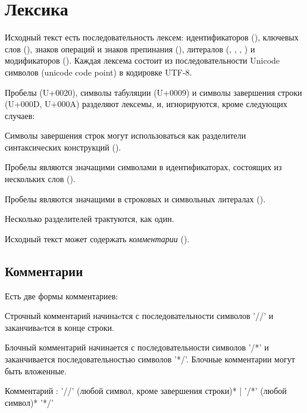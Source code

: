 \hypertarget{lexica}{%
\section{Лексика}\label{lex:chapter}}

Исходный текст есть последовательность лексем: идентификаторов (), ключевых слов (), 
знаков операций и знаков препинания (), литералов (, , , ) и модификаторов (). 
Каждая лексема состоит из последовательности Unicode символов (unicode code point) в кодировке UTF-8.

Пробелы (U+0020), символы табуляции (U+0009) и символы завершения строки (U+000D, U+000A) разделяют лексемы, и, игнорируются, кроме следующих случаев:
\begin{d_itemize}
\item
Символы завершения строк могут использоваться как разделители синтаксических конструкций ().
\item
  Пробелы являются значащими символами в идентификаторах, состоящих из нескольких слов (). 
\item
  Пробелы являются значащими в строковых и символьных литералах (). 
\end{d_itemize}

Несколько разделителей трактуются, как один.

\bigskip
Исходный текст может содержать \emph{комментарии} ().

\hypertarget{comments}{%
\subsection{Комментарии}\label{lex:comments}}

Есть две формы комментариев:
\begin{d_itemize}
\item
Строчный комментарий начинаeтся с последовательности символов '//' и заканчиваeтся в конце строки.
\item
Блочный комментарий начинается с последовательности символов '/*' и заканчивается последовательностью символов '*/'. 
Блочные комментарии могут быть вложенные.
\end{d_itemize}

\begin{Grammar}
Комментарий
    : '//' (любой символ, кроме завершения строки)*
    | '/*'  (любой символ)* '*/'
\end{Grammar}

